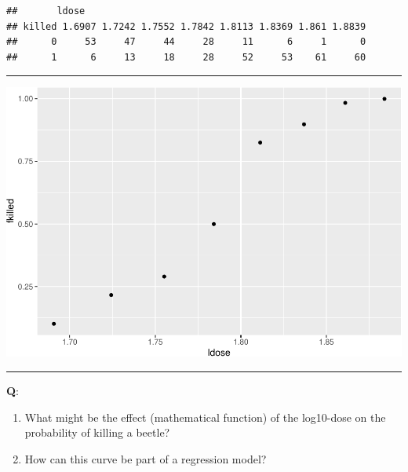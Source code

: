 \documentclass[
]{article}
\newenvironment{Shaded}{\begin{snugshade}}{\end{snugshade}}
\newcommand{\AttributeTok}[1]{\textcolor[rgb]{0.13,0.29,0.53}{#1}}
\newcommand{\CommentTok}[1]{\textcolor[rgb]{0.56,0.35,0.01}{\textit{#1}}}
\newcommand{\FunctionTok}[1]{\textcolor[rgb]{0.13,0.29,0.53}{\textbf{#1}}}
\newcommand{\NormalTok}[1]{#1}
\newcommand{\OtherTok}[1]{\textcolor[rgb]{0.56,0.35,0.01}{#1}}
\newcommand{\SpecialCharTok}[1]{\textcolor[rgb]{0.81,0.36,0.00}{\textbf{#1}}}
\providecommand{\tightlist}{%
  \setlength{\itemsep}{0pt}\setlength{\parskip}{0pt}}
\begin{document}
\begin{verbatim}
##       ldose
## killed 1.6907 1.7242 1.7552 1.7842 1.8113 1.8369 1.861 1.8839
##      0     53     47     44     28     11      6     1      0
##      1      6     13     18     28     52     53    61     60
\end{verbatim}

\begin{center}\rule{0.5\linewidth}{0.5pt}\end{center}

\begin{Shaded}
\end{Shaded}

\includegraphics{3BinReg_files/figure-latex/unnamed-chunk-2-1.pdf}

\begin{center}\rule{0.5\linewidth}{0.5pt}\end{center}

\textbf{Q}:

\begin{enumerate}
\def\labelenumi{\alph{enumi}.}
\tightlist
\item
  What might be the effect (mathematical function) of the log10-dose on
  the probability of killing a beetle?
\item
  How can this curve be part of a regression model?
\end{enumerate}
\end{document}
